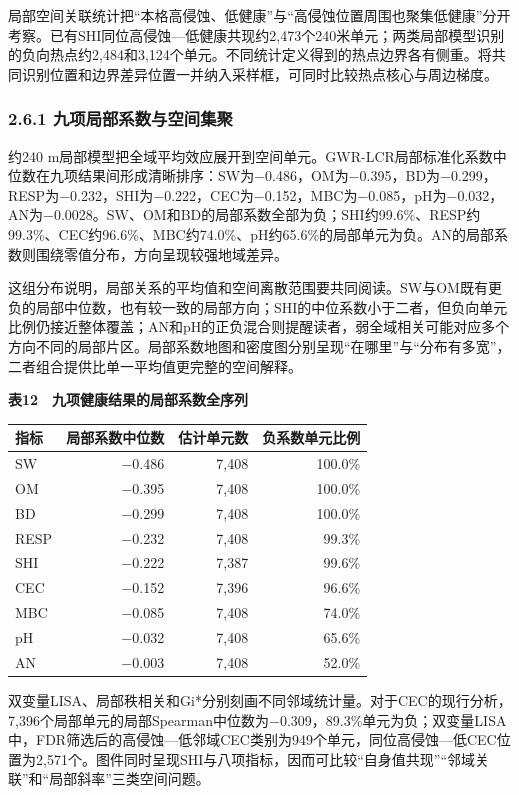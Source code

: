 \documentclass[
  11pt,
  a4paper,
]{ctexart}
\begin{document}
局部空间关联统计把``本格高侵蚀、低健康''与``高侵蚀位置周围也聚集低健康''分开考察。已有SHI同位高侵蚀---低健康共现约2,473个240米单元；两类局部模型识别的负向热点约2,484和3,124个单元。不同统计定义得到的热点边界各有侧重。将共同识别位置和边界差异位置一并纳入采样框，可同时比较热点核心与周边梯度。

\hypertarget{ux4e5dux9879ux5c40ux90e8ux7cfbux6570ux4e0eux7a7aux95f4ux96c6ux805a}{%
\subsubsection{2.6.1
九项局部系数与空间集聚}\label{ux4e5dux9879ux5c40ux90e8ux7cfbux6570ux4e0eux7a7aux95f4ux96c6ux805a}}

约240
m局部模型把全域平均效应展开到空间单元。GWR-LCR局部标准化系数中位数在九项结果间形成清晰排序：SW为−0.486，OM为−0.395，BD为−0.299，RESP为−0.232，SHI为−0.222，CEC为−0.152，MBC为−0.085，pH为−0.032，AN为−0.0028。SW、OM和BD的局部系数全部为负；SHI约99.6\%、RESP约99.3\%、CEC约96.6\%、MBC约74.0\%、pH约65.6\%的局部单元为负。AN的局部系数则围绕零值分布，方向呈现较强地域差异。

这组分布说明，局部关系的平均值和空间离散范围要共同阅读。SW与OM既有更负的局部中位数，也有较一致的局部方向；SHI的中位系数小于二者，但负向单元比例仍接近整体覆盖；AN和pH的正负混合则提醒读者，弱全域相关可能对应多个方向不同的局部片区。局部系数地图和密度图分别呈现``在哪里''与``分布有多宽''，二者组合提供比单一平均值更完整的空间解释。

\textbf{表12　九项健康结果的局部系数全序列}

\begin{longtable}[]{@{}lrrr@{}}
\toprule
指标 & 局部系数中位数 & 估计单元数 & 负系数单元比例 \\
\midrule
\endhead
SW & −0.486 & 7,408 & 100.0\% \\
OM & −0.395 & 7,408 & 100.0\% \\
BD & −0.299 & 7,408 & 100.0\% \\
RESP & −0.232 & 7,408 & 99.3\% \\
SHI & −0.222 & 7,387 & 99.6\% \\
CEC & −0.152 & 7,396 & 96.6\% \\
MBC & −0.085 & 7,408 & 74.0\% \\
pH & −0.032 & 7,408 & 65.6\% \\
AN & −0.003 & 7,408 & 52.0\% \\
\bottomrule
\end{longtable}

双变量LISA、局部秩相关和Gi*分别刻画不同邻域统计量。对于CEC的现行分析，7,396个局部单元的局部Spearman中位数为−0.309，89.3\%单元为负；双变量LISA中，FDR筛选后的高侵蚀---低邻域CEC类别为949个单元，同位高侵蚀---低CEC位置为2,571个。图件同时呈现SHI与八项指标，因而可比较``自身值共现''``邻域关联''和``局部斜率''三类空间问题。
\end{document}

